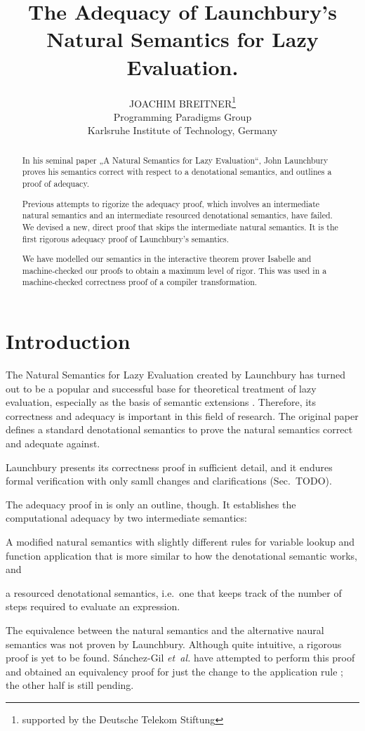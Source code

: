 \documentclass{jfp1}
\title[The Adequacy of Launchbury's Semantics]
      {The Adequacy of Launchbury's\\ Natural Semantics for Lazy Evaluation.}
\author[J. Breitner]
        {JOACHIM BREITNER\thanks{supported by the Deutsche Telekom Stiftung}\\
	Programming Paradigms Group\\
         Karlsruhe Institute of Technology, Germany\\
         \email{breitner@kit.edu}}
\theoremstyle{nonumberbreak}
\begin{document}
\label{firstpage}

\maketitle

\begin{abstract}
In his seminal paper „A Natural Semantics for Lazy Evaluation“, John Launchbury
proves his semantics correct with respect to a denotational semantics, and outlines a proof of adequacy.

Previous attempts to rigorize the adequacy proof, which involves an intermediate natural semantics and an intermediate resourced denotational semantics, have failed. We devised a new, direct proof that skips the intermediate natural semantics. It is the first rigorous adequacy proof of Launchbury’s semantics.

We have modelled our semantics in the interactive theorem prover Isabelle and machine-checked our proofs to obtain a maximum level of rigor. This was used in a machine-checked correctness proof of a compiler transformation.
\end{abstract}


\section{Introduction}

The Natural Semantics for Lazy Evaluation created by Launchbury  has turned out to be a popular and successful base for theoretical treatment of lazy evaluation, especially as the basis of semantic extensions \cite{nakata, nakata_blackhole, distributed, mixed, parallel}. Therefore, its correctness and adequacy is important in this field of research. The original paper defines a standard denotational semantics to prove the natural semantics correct and adequate against.

Launchbury presents its correctness proof in sufficient detail, and it endures formal verification with only samll changes and clarifications (Sec.~TODO).

The adequacy proof in \cite{launchbury} is only an outline, though. It establishes the computational adequacy by two intermediate semantics:
\begin{compactitem}
\item A modified natural semantics with slightly different rules for variable lookup and function application that is more similar to how the denotational semantic works, and
\item a resourced denotational semantics, i.e.~one that keeps track of the number of steps required to evaluate an expression.
\end{compactitem}
The equivalence between the natural semantics and the alternative naural semantics was not proven by Launchbury. Although quite intuitive, a rigorous proof is yet to be found. S{\'a}nchez-Gil {\em et~al.} have attempted to perform this proof and obtained an equivalency proof for just the change to the application rule ; the other half is still pending.
\end{document}
